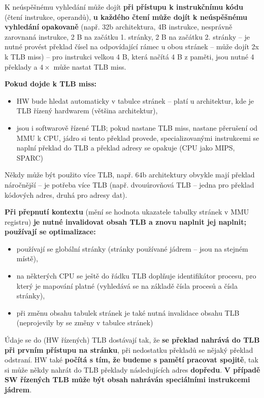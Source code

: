 \documentclass[a4paper, 11pt]{article}
\begin{document}
K neúspěšnému vyhledání může dojít \textbf{při přístupu k instrukčnímu kódu} (čtení instrukce, operandů), \textbf{u každého čtení může dojít k neúspěšnému vyhledání opakovaně} (např. 32b architektura, 4B instrukce, nesprávně zarovnaná instrukce, 2 B na začátku 1. stránky, 2 B na začátku 2. stránky -- je nutné provést překlad čísel na odpovídající rámec u obou stránek -- může dojít 2x k TLB miss) -- pro instrukci velkou 4 B, která načítá 4 B z paměti, jsou nutné 4 překlady a $4\times$ může nastat TLB miss.

\textbf{Pokud dojde k TLB miss:}
\begin{itemize}
 \item HW bude hledat automaticky v tabulce stránek -- platí u architektur, kde je TLB  řízený hardwarem (většina architektur),
 \item jsou i softwarově řízené TLB; pokud nastane TLB miss, nastane přerušení od MMU k CPU, jádro si tento překlad provede, specializovanými instrukcemi se naplní překlad do TLB a překlad adresy se opakuje (CPU jako MIPS, SPARC)
\end{itemize}

Někdy může být použito více TLB, např. 64b architektury obvykle mají překlad náročnější -- je potřeba více TLB (např. dvouúrovňová TLB -- jedna pro překlad kódových adres, druhá pro adresy dat).

\textbf{Při přepnutí kontextu} (mění se hodnota ukazatele tabulky stránek v MMU registru) \textbf{je nutné invalidovat obsah TLB a znovu naplnit jej naplnit; používají se optimalizace:}
\begin{itemize}
 \item používají se globální stránky (stránky používané jádrem -- jsou na stejném místě),
 \item na některých CPU se ještě do řádku TLB doplňuje identifikátor procesu, pro který je mapování platné (vyhledává se na základě čísla procesů a čísla stránky),
 \item při změnu obsahu tabulek stránek je také nutná invalidace obsahu TLB (neprojevily by se změny v tabulce stránek)
\end{itemize}

Údaje se do (HW řízených) TLB dostávají tak, že \textbf{se překlad nahrává do TLB při prvním přístupu na stránku}, při nedostatku překladů se nějaký překlad odstraní. HW také \textbf{počítá s tím, že budeme s pamětí pracovat spojitě}, tak si může někdy nahrát do TLB překlady následujících adres \textbf{dopředu}. \textbf{V případě SW řízených TLB může být obsah nahráván speciálními instrukcemi jádrem}.
\end{document}
